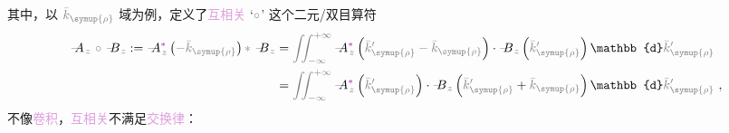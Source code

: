 其中，以 $\mathcolor{gray}{\bar{k}_{\symup{\rho}}}$ 域为例，定义了\textcolor{Plum}{互相关} `$\textcolor{gray}{\circ}$' 这个二元/双目算符
\begin{subequations} \label{eq:AcircB}
\begin{align}
	\Xint{\mathcolor{gray}{-}}{18}{A}_{\;\! \mathcolor{gray}{z}} ~\textcolor{gray}{\circ}~ \Xint{\mathcolor{gray}{-}}{18}{B}_{\;\! \mathcolor{gray}{z}} := \Xint{\mathcolor{gray}{-}}{18}{A}_{\;\! \mathcolor{gray}{z}}^{\textcolor{Plum}{*}} \left( \mathcolor{gray}{- \bar{k}_{\symup{\rho}}} \right) \textcolor{gray}{*}~ \Xint{\mathcolor{gray}{-}}{18}{B}_{\;\! \mathcolor{gray}{z}} &= \mathcolor{gray}{\iint_{-\infty}^{+\infty}} \Xint{\mathcolor{gray}{-}}{18}{A}_{\;\! \mathcolor{gray}{z}}^{\textcolor{Plum}{*}} \left( \mathcolor{gray}{\bar{k}'_{\symup{\rho}}} \mathcolor{gray}{- \bar{k}_{\symup{\rho}}} \right) \cdot \Xint{\mathcolor{gray}{-}}{18}{B}_{\;\! \mathcolor{gray}{z}} \left( \mathcolor{gray}{\bar{k}'_{\symup{\rho}}} \right) \mathbb{d} \mathcolor{gray}{\bar{k}'_{\symup{\rho}}} \label{eq:AcircB-a} \\ &= \mathcolor{gray}{\iint_{-\infty}^{+\infty}} \Xint{\mathcolor{gray}{-}}{18}{A}_{\;\! \mathcolor{gray}{z}}^{\textcolor{Plum}{*}} \left( \mathcolor{gray}{\bar{k}'_{\symup{\rho}}} \right) \cdot \Xint{\mathcolor{gray}{-}}{18}{B}_{\;\! \mathcolor{gray}{z}} \left( \mathcolor{gray}{\bar{k}'_{\symup{\rho}}} + \mathcolor{gray}{\bar{k}_{\symup{\rho}}} \right) \mathbb{d} \mathcolor{gray}{\bar{k}'_{\symup{\rho}}} \label{eq:AcircB-b}~, 
\end{align}
\end{subequations}
不像\textcolor{Plum}{卷积}，\textcolor{Plum}{互相关}不满足\textcolor{Plum}{交换律}：
